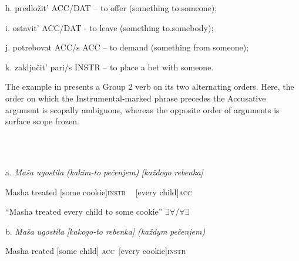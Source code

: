 \documentclass[output=paper,modfonts, nonflat]{langsci/langscibook}
\begin{document}
\begin{styleinnerExample}
  h.   predložit’ ACC/DAT – to offer (something to.someone);
\end{styleinnerExample}

\begin{styleinnerExample}
  i.   ostavit’ ACC/DAT  {}- to leave (something to.somebody);
\end{styleinnerExample}

\begin{styleinnerExample}
  j.   potrebovat ACC/s ACC – to demand (something from someone);
\end{styleinnerExample}

\begin{styleinnerExample}
  k.   zaključit’ pari/s INSTR – to place a bet with someone.
\end{styleinnerExample}

The example in  presents a Group 2 verb on its two alternating orders. Here, the order on which the Instrumental-marked phrase precedes the Accusative argument is scopally ambiguous, whereas the opposite order of arguments is surface scope frozen. 

\begin{styleinnerExample}
\ea%
    \label{ex:key:15}
    \gll\\
        \\
    \glt
    \z

          a.  \textit{Maša}   \textit{ugostila} \textit{(kakim-to} \textit{pečenjem)}       \textit{[každogo} \textit{rebenka]}
\end{styleinnerExample}

\begin{styleinnerExample}
    Masha treated  [some        cookie]\textsc{instr} \textsc{~} [every     child]\textsc{acc}
\end{styleinnerExample}

\begin{styleinnerExample}
    “Masha treated every child to some cookie” ${\exists}{\forall}$/${\forall}{\exists}$
\end{styleinnerExample}

\begin{styleinnerExample}
  b.  \textit{Maša}   \textit{ugostila} \textit{[kakogo-to} \textit{rebenka]}    \textit{(každym} \textit{pečenjem)}
\end{styleinnerExample}

\begin{styleinnerExample}
    Masha reated    [some         child] \textsc{acc~}[every    cookie]\textsc{instr}
\end{styleinnerExample}
\end{document}
